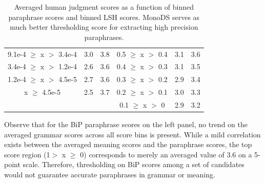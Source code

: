 \documentclass[11pt]{article}
\begin{document}
\begin{table}
\begin{center}
\begin{tabular}{ccc|ccc}
{\scriptsize 9.1e-4 $\ge$ x $>$ 3.4e-4} & {\scriptsize 3.0} & {\scriptsize 3.8} & {\scriptsize 0.5 $\geq$ x $>$ 0.4} & {\scriptsize 3.1 } & {\scriptsize 3.6}  \\
{\scriptsize 3.4e-4 $\ge$ x $>$ 1.2e-4} & {\scriptsize 2.6} & {\scriptsize 3.6} & {\scriptsize 0.4 $\geq$ x $>$ 0.3} & {\scriptsize 3.1} & {\scriptsize 3.5} \\
{\scriptsize 1.2e-4 $\ge$ x $>$ 4.5e-5} & {\scriptsize 2.7} & {\scriptsize 3.6} & {\scriptsize 0.3 $\geq$ x $>$ 0.2} & {\scriptsize 2.9} & {\scriptsize 3.4} \\
{\scriptsize x $\ge$ 4.5e-5} & {\scriptsize 2.5} & {\scriptsize 3.7} & {\scriptsize 0.2 $\geq$ x $>$ 0.1} & {\scriptsize 3.0} & {\scriptsize 3.3} \\
&&& {\scriptsize 0.1 $\geq$ x $>$ 0} & {\scriptsize 2.9} & {\scriptsize 3.2} \\
\hline
\end{tabular}
\end{center}
\caption{Averaged human judgment scores as a function of binned paraphrase scores and binned LSH scores. %
MonoDS serves as much better thresholding score for extracting high precision paraphrases.}
\label{table9}
\end{table}


Observe that for the BiP paraphrase scores on the left panel, no trend on the averaged grammar scores across all score bins is present. While a mild correlation exists between the averaged meaning scores and the paraphrase scores, the top score region (1$>$ x $\ge$ 0) corresponds to merely an averaged value of 3.6 on a 5-point scale. Therefore, thresholding on BiP scores among a set of candidates would not guarantee accurate paraphrases in grammar or meaning.
\end{document}
